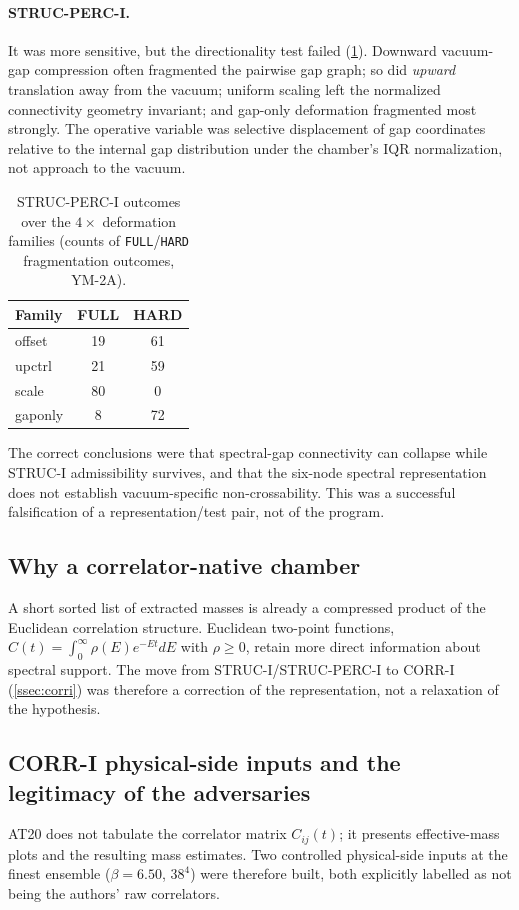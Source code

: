 \documentclass[11pt,a4paper]{article}
\theoremstyle{definition}
\theoremstyle{remark}
\begin{document}
\paragraph{STRUC-PERC-I.} It was more sensitive, but the directionality test failed (\cref{tab:ym2a}). Downward vacuum-gap compression often fragmented the pairwise gap graph; so did \emph{upward} translation away from the vacuum; uniform scaling left the normalized connectivity geometry invariant; and gap-only deformation fragmented most strongly. The operative variable was selective displacement of gap coordinates relative to the internal gap distribution under the chamber's IQR normalization, not approach to the vacuum.
\begin{table}[t]
\centering\small
\caption{STRUC-PERC-I outcomes over the $4\times$ deformation families (counts of \texttt{FULL}/\texttt{HARD} fragmentation outcomes, YM-2A).}\label{tab:ym2a}
\begin{tabular}{@{}lcc@{}}\toprule Family & FULL & HARD\\\midrule offset & 19 & 61\\ upctrl & 21 & 59\\ scale & 80 & 0\\ gaponly & 8 & 72\\\bottomrule\end{tabular}
\end{table}
The correct conclusions were that spectral-gap connectivity can collapse while STRUC-I admissibility survives, and that the six-node spectral representation does not establish vacuum-specific non-crossability. This was a successful falsification of a representation/test pair, not of the program.

\subsection{Why a correlator-native chamber}
A short sorted list of extracted masses is already a compressed product of the Euclidean correlation structure. Euclidean two-point functions, $C(t)=\int_0^\infty\rho(E)e^{-Et}dE$ with $\rho\ge0$, retain more direct information about spectral support. The move from STRUC-I/STRUC-PERC-I to CORR-I (\cref{ssec:corri}) was therefore a correction of the representation, not a relaxation of the hypothesis.

\subsection{CORR-I physical-side inputs and the legitimacy of the adversaries}
AT20 does not tabulate the correlator matrix $C_{ij}(t)$; it presents effective-mass plots and the resulting mass estimates. Two controlled physical-side inputs at the finest ensemble ($\beta=6.50$, $38^4$) were therefore built, both explicitly labelled as not being the authors' raw correlators.
\end{document}

